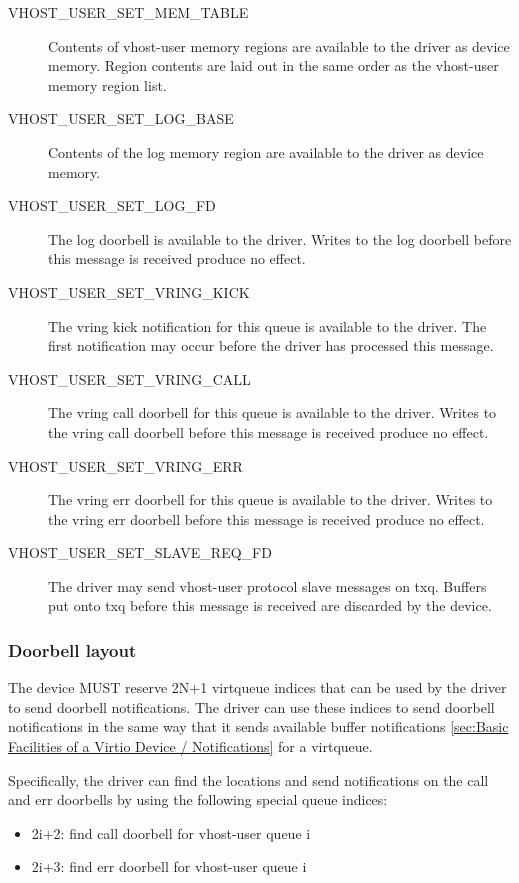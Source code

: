 \begin{description}
\item[VHOST_USER_SET_MEM_TABLE] Contents of vhost-user memory regions are available to the driver as device memory. Region contents are laid out in the same order as the vhost-user memory region list.
\item[VHOST_USER_SET_LOG_BASE] Contents of the log memory region are available to the driver as device memory.
\item[VHOST_USER_SET_LOG_FD] The log doorbell is available to the driver.  Writes to the log doorbell before this message is received produce no effect.
\item[VHOST_USER_SET_VRING_KICK] The vring kick notification for this queue is available to the driver.  The first notification may occur before the driver has processed this message.
\item[VHOST_USER_SET_VRING_CALL] The vring call doorbell for this queue is available to the driver.  Writes to the vring call doorbell before this message is received produce no effect.
\item[VHOST_USER_SET_VRING_ERR] The vring err doorbell for this queue is available to the driver.  Writes to the vring err doorbell before this message is received produce no effect.
\item[VHOST_USER_SET_SLAVE_REQ_FD] The driver may send vhost-user protocol slave messages on txq.  Buffers put onto txq before this message is received are discarded by the device.
\end{description}

\subsubsection{Doorbell layout}\label{sec:Device Types / Vhost-user Device Backend / Additional Device Resources / Doorbell layout}

The device MUST reserve 2N+1 virtqueue indices that can be used by the driver to
send doorbell notifications. The driver can use these indices to send doorbell
notifications in the same way that it sends available buffer notifications
\ref{sec:Basic Facilities of a Virtio Device / Notifications} for a virtqueue.

Specifically, the driver can find the locations and send notifications on the
call and err doorbells by using the following special queue indices:

\begin{itemize}
\item 2i+2: find call doorbell for vhost-user queue i
\item 2i+3: find err doorbell for vhost-user queue i
\end{itemize}

